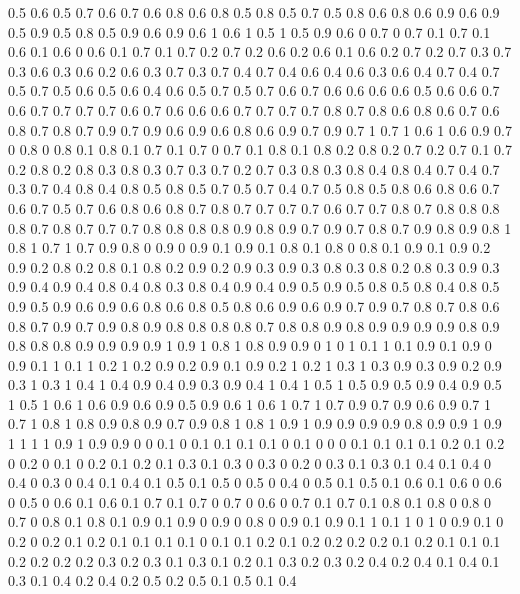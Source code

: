 0.5 0.6
0.5 0.7
0.6 0.7
0.6 0.8
0.6 0.8
0.5 0.8
0.5 0.7
0.5 0.8
0.6 0.8
0.6 0.9
0.6 0.9
0.5 0.9
0.5 0.8
0.5 0.9
0.6 0.9
0.6 1
0.6 1
0.5 1
0.5 0.9
0.6 0
0.7 0
0.7 0.1
0.7 0.1
0.6 0.1
0.6 0
0.6 0.1
0.7 0.1
0.7 0.2
0.7 0.2
0.6 0.2
0.6 0.1
0.6 0.2
0.7 0.2
0.7 0.3
0.7 0.3
0.6 0.3
0.6 0.2
0.6 0.3
0.7 0.3
0.7 0.4
0.7 0.4
0.6 0.4
0.6 0.3
0.6 0.4
0.7 0.4
0.7 0.5
0.7 0.5
0.6 0.5
0.6 0.4
0.6 0.5
0.7 0.5
0.7 0.6
0.7 0.6
0.6 0.6
0.6 0.5
0.6 0.6
0.7 0.6
0.7 0.7
0.7 0.7
0.6 0.7
0.6 0.6
0.6 0.7
0.7 0.7
0.7 0.8
0.7 0.8
0.6 0.8
0.6 0.7
0.6 0.8
0.7 0.8
0.7 0.9
0.7 0.9
0.6 0.9
0.6 0.8
0.6 0.9
0.7 0.9
0.7 1
0.7 1
0.6 1
0.6 0.9
0.7 0
0.8 0
0.8 0.1
0.8 0.1
0.7 0.1
0.7 0
0.7 0.1
0.8 0.1
0.8 0.2
0.8 0.2
0.7 0.2
0.7 0.1
0.7 0.2
0.8 0.2
0.8 0.3
0.8 0.3
0.7 0.3
0.7 0.2
0.7 0.3
0.8 0.3
0.8 0.4
0.8 0.4
0.7 0.4
0.7 0.3
0.7 0.4
0.8 0.4
0.8 0.5
0.8 0.5
0.7 0.5
0.7 0.4
0.7 0.5
0.8 0.5
0.8 0.6
0.8 0.6
0.7 0.6
0.7 0.5
0.7 0.6
0.8 0.6
0.8 0.7
0.8 0.7
0.7 0.7
0.7 0.6
0.7 0.7
0.8 0.7
0.8 0.8
0.8 0.8
0.7 0.8
0.7 0.7
0.7 0.8
0.8 0.8
0.8 0.9
0.8 0.9
0.7 0.9
0.7 0.8
0.7 0.9
0.8 0.9
0.8 1
0.8 1
0.7 1
0.7 0.9
0.8 0
0.9 0
0.9 0.1
0.9 0.1
0.8 0.1
0.8 0
0.8 0.1
0.9 0.1
0.9 0.2
0.9 0.2
0.8 0.2
0.8 0.1
0.8 0.2
0.9 0.2
0.9 0.3
0.9 0.3
0.8 0.3
0.8 0.2
0.8 0.3
0.9 0.3
0.9 0.4
0.9 0.4
0.8 0.4
0.8 0.3
0.8 0.4
0.9 0.4
0.9 0.5
0.9 0.5
0.8 0.5
0.8 0.4
0.8 0.5
0.9 0.5
0.9 0.6
0.9 0.6
0.8 0.6
0.8 0.5
0.8 0.6
0.9 0.6
0.9 0.7
0.9 0.7
0.8 0.7
0.8 0.6
0.8 0.7
0.9 0.7
0.9 0.8
0.9 0.8
0.8 0.8
0.8 0.7
0.8 0.8
0.9 0.8
0.9 0.9
0.9 0.9
0.8 0.9
0.8 0.8
0.8 0.9
0.9 0.9
0.9 1
0.9 1
0.8 1
0.8 0.9
0.9 0
1 0
1 0.1
1 0.1
0.9 0.1
0.9 0
0.9 0.1
1 0.1
1 0.2
1 0.2
0.9 0.2
0.9 0.1
0.9 0.2
1 0.2
1 0.3
1 0.3
0.9 0.3
0.9 0.2
0.9 0.3
1 0.3
1 0.4
1 0.4
0.9 0.4
0.9 0.3
0.9 0.4
1 0.4
1 0.5
1 0.5
0.9 0.5
0.9 0.4
0.9 0.5
1 0.5
1 0.6
1 0.6
0.9 0.6
0.9 0.5
0.9 0.6
1 0.6
1 0.7
1 0.7
0.9 0.7
0.9 0.6
0.9 0.7
1 0.7
1 0.8
1 0.8
0.9 0.8
0.9 0.7
0.9 0.8
1 0.8
1 0.9
1 0.9
0.9 0.9
0.9 0.8
0.9 0.9
1 0.9
1 1
1 1
0.9 1
0.9 0.9
0 0
0.1 0
0.1 0.1
0.1 0.1
0 0.1
0 0
0 0.1
0.1 0.1
0.1 0.2
0.1 0.2
0 0.2
0 0.1
0 0.2
0.1 0.2
0.1 0.3
0.1 0.3
0 0.3
0 0.2
0 0.3
0.1 0.3
0.1 0.4
0.1 0.4
0 0.4
0 0.3
0 0.4
0.1 0.4
0.1 0.5
0.1 0.5
0 0.5
0 0.4
0 0.5
0.1 0.5
0.1 0.6
0.1 0.6
0 0.6
0 0.5
0 0.6
0.1 0.6
0.1 0.7
0.1 0.7
0 0.7
0 0.6
0 0.7
0.1 0.7
0.1 0.8
0.1 0.8
0 0.8
0 0.7
0 0.8
0.1 0.8
0.1 0.9
0.1 0.9
0 0.9
0 0.8
0 0.9
0.1 0.9
0.1 1
0.1 1
0 1
0 0.9
0.1 0
0.2 0
0.2 0.1
0.2 0.1
0.1 0.1
0.1 0
0.1 0.1
0.2 0.1
0.2 0.2
0.2 0.2
0.1 0.2
0.1 0.1
0.1 0.2
0.2 0.2
0.2 0.3
0.2 0.3
0.1 0.3
0.1 0.2
0.1 0.3
0.2 0.3
0.2 0.4
0.2 0.4
0.1 0.4
0.1 0.3
0.1 0.4
0.2 0.4
0.2 0.5
0.2 0.5
0.1 0.5
0.1 0.4
